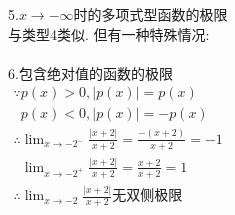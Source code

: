 \documentclass[UTF8, fontset=ubuntu]{ctexart}
\begin{document}
5.$x\to-\infty$时的多项式型函数的极限\\
与类型4类似. 但有一种特殊情况:\\[1ex]
\\[2ex]

6.包含绝对值的函数的极限\\
\begin{math}
\begin{array}{l}
\because p(x)>0, |p(x)|=p(x)\\ 
\phantom{\because}p(x)<0, |p(x)|=-p(x)\\
\displaystyle\therefore\lim_{x\to -2^-}\frac{|x+2|}{x+2}=\frac{-(x+2)}{x+2}=-1\\
\displaystyle\phantom{\therefore}\lim_{x\to -2^+}\frac{|x+2|}{x+2}=\frac{x+2}{x+2}=1\\
\displaystyle\therefore\lim_{x\to -2}\frac{|x+2|}{x+2}\text{无双侧极限}
\end{array}
\end{math}
\end{document}
